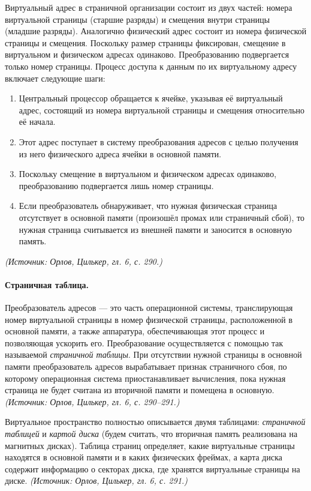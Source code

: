 \documentclass[a4paper,12pt]{article}
\begin{document}
Виртуальный адрес в страничной организации состоит из двух частей: номера виртуальной страницы (старшие разряды) и смещения внутри страницы (младшие разряды). Аналогично физический адрес состоит из номера физической страницы и смещения. Поскольку размер страницы фиксирован, смещение в виртуальном и физическом адресах одинаково. Преобразованию подвергается только номер страницы. Процесс доступа к данным по их виртуальному адресу включает следующие шаги:
\begin{enumerate}[label=\arabic*)]
\item Центральный процессор обращается к ячейке, указывая её виртуальный адрес, состоящий из номера виртуальной страницы и смещения относительно её начала.
\item Этот адрес поступает в систему преобразования адресов с целью получения из него физического адреса ячейки в основной памяти.
\item Поскольку смещение в виртуальном и физическом адресах одинаково, преобразованию подвергается лишь номер страницы.
\item Если преобразователь обнаруживает, что нужная физическая страница отсутствует в основной памяти (произошёл промах или страничный сбой), то нужная страница считывается из внешней памяти и заносится в основную память.
\end{enumerate}
\textit{(Источник: Орлов, Цилькер, гл. 6, с. 290.)}

\paragraph{Страничная таблица.}
Преобразователь адресов --- это часть операционной системы, транслирующая номер виртуальной страницы в номер физической страницы, расположенной в основной памяти, а также аппаратура, обеспечивающая этот процесс и позволяющая ускорить его. Преобразование осуществляется с помощью так называемой \emph{страничной таблицы}. При отсутствии нужной страницы в основной памяти преобразователь адресов вырабатывает признак страничного сбоя, по которому операционная система приостанавливает вычисления, пока нужная страница не будет считана из вторичной памяти и помещена в основную.
\textit{(Источник: Орлов, Цилькер, гл. 6, с. 290--291.)}

Виртуальное пространство полностью описывается двумя таблицами: \emph{страничной таблицей} и \emph{картой диска} (будем считать, что вторичная память реализована на магнитных дисках). Таблица страниц определяет, какие виртуальные страницы находятся в основной памяти и в каких физических фреймах, а карта диска содержит информацию о секторах диска, где хранятся виртуальные страницы на диске.
\textit{(Источник: Орлов, Цилькер, гл. 6, с. 291.)}
\end{document}
